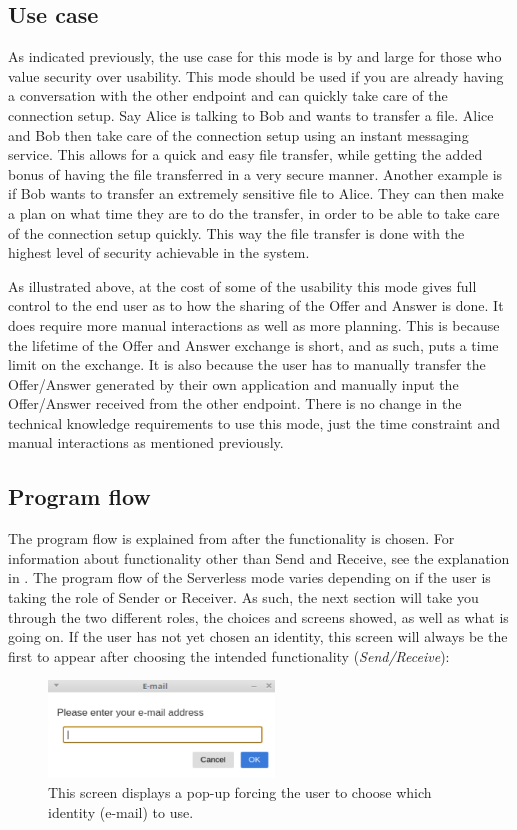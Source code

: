 \subsection{Use case}
%
As indicated previously, the use case for this mode is by and large for those who value security over usability. This mode should be used if you are already having a conversation with the other endpoint and can quickly take care of the connection setup. Say Alice is talking to Bob and wants to transfer a file. Alice and Bob then take care of the connection setup using an instant messaging service. This allows for a quick and easy file transfer, while getting the added bonus of having the file transferred in a very secure manner. Another example is if Bob wants to transfer an extremely sensitive file to Alice. They can then make a plan on what time they are to do the transfer, in order to be able to take care of the connection setup quickly. This way the file transfer is done with the highest level of security achievable in the system.

As illustrated above, at the cost of some of the usability this mode gives full control to the end user as to how the sharing of the Offer and Answer is done. It does require more manual interactions as well as more planning. This is because the lifetime of the Offer and Answer exchange is short, and as such, puts a time limit on the exchange. It is also because the user has to manually transfer the Offer/Answer generated by their own application and manually input the Offer/Answer received from the other endpoint. There is no change in the technical knowledge requirements to use this mode, just the time constraint and manual interactions as mentioned previously.
%
\subsection{Program flow}
%
The program flow is explained from after the functionality is chosen. For information about functionality other than Send and Receive, see the explanation in .
The program flow of the Serverless mode varies depending on if the user is taking the role of Sender or Receiver. As such, the next section will take you through the two different roles, the choices and screens showed, as well as what is going on. If the user has not yet chosen an identity, this screen will always be the first to appear after choosing the intended functionality (\emph{Send/Receive}):
\begin{figure}[H]
  \centering
  \includegraphics[width=60mm]{Figures/SL/pop_up_own}
  \decoRule
  \caption[Serverless mode: Register identity screen]{This screen displays a pop-up forcing the user to choose which identity (e-mail) to use.}
  \label{fig:serv_popown}
\end{figure}

